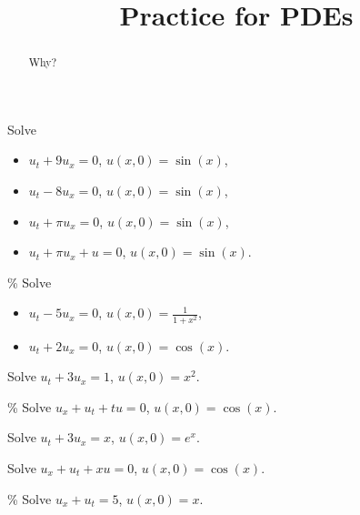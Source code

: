 \documentclass{ximera}
\title{Practice for PDEs}
\begin{document}
\begin{abstract}
Why?
\end{abstract}
\maketitle


\begin{exercise}
    Solve
    \begin{itemize}
        \item $u_t +9u_x = 0$, \enspace $u(x,0) = \sin(x)$,
        \item $u_t -8u_x = 0$, \enspace $u(x,0) = \sin(x)$,
        \item $u_t +\pi u_x = 0$, \enspace $u(x,0) = \sin(x)$,
        \item $u_t + \pi u_x + u = 0$, \enspace $u(x,0) = \sin(x)$.
    \end{itemize}
\end{exercise}

\begin{exercise}\%
    Solve
    \begin{itemize}
        \item $u_t - 5u_x = 0$, $u(x,0) = \frac{1}{1+x^2}$,
        \item $u_t + 2u_x = 0$, $u(x,0) = \cos(x)$.
    \end{itemize}
\end{exercise}

\begin{exercise}
    Solve $u_t +3u_x = 1$, $u(x,0) = x^2$.
\end{exercise}

\begin{exercise}\%
    Solve $u_x+u_t+tu = 0$, $u(x,0) = \cos(x)$.
\end{exercise}

\begin{exercise}
    Solve $u_t +3u_x = x$, $u(x,0) = e^x$.
\end{exercise}

\begin{exercise}
    Solve $u_x+u_t+xu = 0$, $u(x,0) = \cos(x)$.
\end{exercise}

\begin{exercise}\%
    Solve $u_x+u_t = 5$, $u(x,0) = x$.
\end{exercise}
\end{document}
